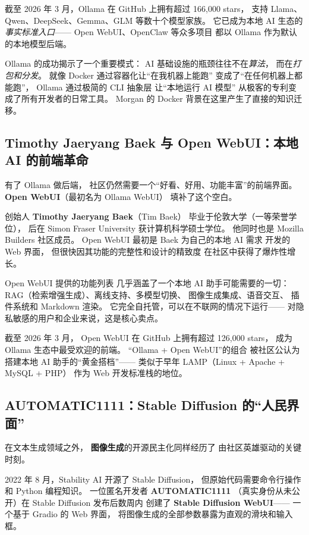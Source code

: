 截至 2026 年 3 月，Ollama 在 GitHub 上拥有超过 166,000 stars，
支持 Llama、Qwen、DeepSeek、Gemma、GLM 等数十个模型家族。
它已成为本地 AI 生态的\emph{事实标准入口}——
Open WebUI、OpenClaw 等众多项目
都以 Ollama 作为默认的本地模型后端。

\begin{keybox}
Ollama 的成功揭示了一个重要模式：
AI 基础设施的瓶颈往往不在\emph{算法}，
而在\emph{打包和分发}。
就像 Docker 通过容器化让``在我机器上能跑''
变成了``在任何机器上都能跑''，
Ollama 通过极简的 CLI 抽象层
让``本地运行 AI 模型''
从极客的专利变成了所有开发者的日常工具。
Morgan 的 Docker 背景在这里产生了直接的知识迁移。
\end{keybox}

\subsection{Timothy Jaeryang Baek 与 Open WebUI：本地 AI 的前端革命}

有了 Ollama 做后端，
社区仍然需要一个``好看、好用、功能丰富''的前端界面。
\textbf{Open WebUI}（最初名为 Ollama WebUI）
填补了这个空白。

创始人 \textbf{Timothy Jaeryang Baek}（Tim Baek）
毕业于伦敦大学（一等荣誉学位），
后在 Simon Fraser University 获计算机科学硕士学位。
他同时也是 Mozilla Builders 社区成员。
Open WebUI 最初是 Baek 为自己的本地 AI 需求
开发的 Web 界面，
但很快因其功能的完整性和设计的精致度
在社区中获得了爆炸性增长。

Open WebUI 提供的功能列表
几乎涵盖了一个本地 AI 助手可能需要的一切：
RAG（检索增强生成）、离线支持、多模型切换、
图像生成集成、语音交互、
插件系统和 Markdown 渲染。
它完全自托管，可以在不联网的情况下运行——
对隐私敏感的用户和企业来说，这是核心卖点。

截至 2026 年 3 月，
Open WebUI 在 GitHub 上拥有超过 126,000 stars，
成为 Ollama 生态中最受欢迎的前端。
``Ollama + Open WebUI''的组合
被社区公认为搭建本地 AI 助手的``黄金搭档''——
类似于早年 LAMP（Linux + Apache + MySQL + PHP）
作为 Web 开发标准栈的地位。

\subsection{AUTOMATIC1111：Stable Diffusion 的``人民界面''}

在文本生成领域之外，
\textbf{图像生成}的开源民主化同样经历了
由社区英雄驱动的关键时刻。

2022 年 8 月，Stability AI 开源了 Stable Diffusion，
但原始代码需要命令行操作和 Python 编程知识。
一位匿名开发者 \textbf{AUTOMATIC1111}
（真实身份从未公开）在 Stable Diffusion 发布后数周内
创建了 \textbf{Stable Diffusion WebUI}——
一个基于 Gradio 的 Web 界面，
将图像生成的全部参数暴露为直观的滑块和输入框。

